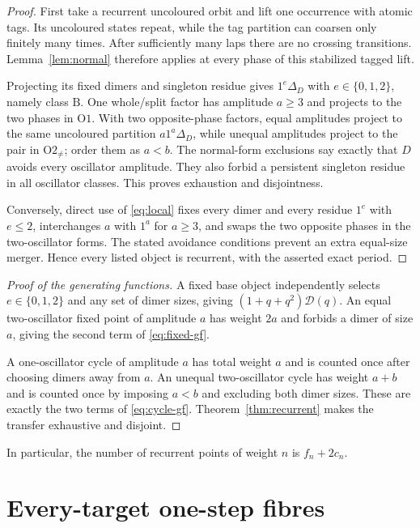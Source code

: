 \documentclass[10pt,a4paper]{amsart}
\theoremstyle{definition}
\theoremstyle{remark}
\newcommand{\D}{\mathcal D}
\begin{document}
\begin{proof}
First take a recurrent uncoloured orbit and lift one occurrence with atomic
tags.  Its uncoloured states repeat, while the tag partition can coarsen only
finitely many times.  After sufficiently many laps there are no crossing
transitions.  Lemma~\ref{lem:normal} therefore applies at every phase of
this stabilized tagged lift.

Projecting its fixed dimers and singleton residue gives
$1^e\Delta_D$ with $e\in\{0,1,2\}$, namely class $\mathrm B$.  One
whole/split factor has amplitude $a\geq3$ and projects to the two phases in
$\mathrm {O1}$.  With two opposite-phase factors, equal amplitudes project
to the same uncoloured partition $a1^a\Delta_D$, while unequal amplitudes
project to the pair in $\mathrm {O2}_{\ne}$; order them as $a<b$.  The
normal-form exclusions say exactly that $D$ avoids every oscillator
amplitude.  They also forbid a persistent singleton residue in all
oscillator classes.  This proves exhaustion and disjointness.

Conversely, direct use of \eqref{eq:local} fixes every dimer and every
residue $1^e$ with $e\leq2$, interchanges $a$ with $1^a$ for $a\geq3$,
and swaps the two opposite phases in the two-oscillator forms.  The stated
avoidance conditions prevent an extra equal-size merger.  Hence every
listed object is recurrent, with the asserted exact period.
\end{proof}

\begin{proof}[Proof of the generating functions]
A fixed base object independently selects $e\in\{0,1,2\}$ and any set of
dimer sizes, giving $(1+q+q^2)\D(q)$.  An equal two-oscillator fixed point
of amplitude $a$ has weight $2a$ and forbids a dimer of size $a$, giving
the second term of \eqref{eq:fixed-gf}.

A one-oscillator cycle of amplitude $a$ has total weight $a$ and is counted
once after choosing dimers away from $a$.  An unequal two-oscillator cycle
has weight $a+b$ and is counted once by imposing $a<b$ and excluding both
dimer sizes.  These are exactly the two terms of \eqref{eq:cycle-gf}.
Theorem~\ref{thm:recurrent} makes the transfer exhaustive and disjoint.
\end{proof}

In particular, the number of recurrent points of weight $n$ is
$f_n+2c_n$.

\section{Every-target one-step fibres}
\end{document}
